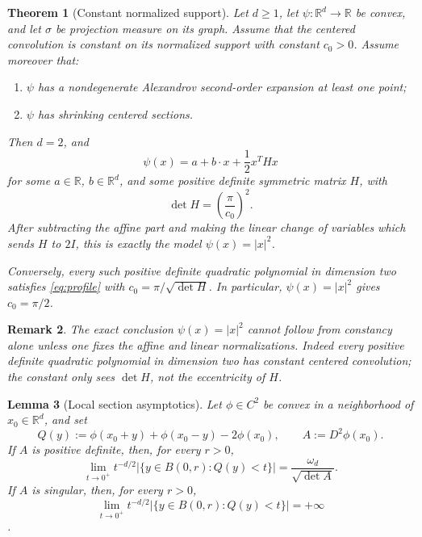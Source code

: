 \documentclass[11pt]{amsart}
\def\R{\mathbb{R}}
\newtheorem{theorem}{Theorem}
\newtheorem{remark}[theorem]{Remark}
\newtheorem{lemma}[theorem]{Lemma}
\begin{document}
\begin{theorem}[Constant normalized support]\label{thm:main}
Let $d\geq 1$, let $\psi:\R^d\to\R$ be convex, and let $\sigma$ be projection
measure on its graph.  Assume that the centered convolution is constant on its
normalized support with constant $c_0>0$.  Assume moreover that:
\begin{enumerate}
    \item $\psi$ has a nondegenerate Alexandrov second-order expansion at
    least one point;
    \item $\psi$ has shrinking centered sections.
\end{enumerate}
Then $d=2$, and
\[
    \psi(x)=a+b\cdot x+\frac12 x^T Hx
\]
for some $a\in\R$, $b\in\R^d$, and some positive definite symmetric matrix
$H$, with
\begin{equation}\label{eq:det-constant}
    \det H=\left(\frac{\pi}{c_0}\right)^2.
\end{equation}
After subtracting the affine part and making the linear change of variables
which sends $H$ to $2I$, this is exactly the model $\psi(x)=|x|^2$.

Conversely, every such positive definite quadratic polynomial in dimension two
satisfies \eqref{eq:profile} with $c_0=\pi/\sqrt{\det H}$.  In particular,
$\psi(x)=|x|^2$ gives $c_0=\pi/2$.
\end{theorem}

\begin{remark}
The exact conclusion $\psi(x)=|x|^2$ cannot follow from constancy alone unless
one fixes the affine and linear normalizations.  Indeed every positive
definite quadratic polynomial in dimension two has constant centered
convolution; the constant only sees $\det H$, not the eccentricity of $H$.
\end{remark}

\begin{lemma}[Local section asymptotics]\label{lem:local-section}
Let $\phi\in C^2$ be convex in a neighborhood of $x_0\in\R^d$, and set
\[
    Q(y):=\phi(x_0+y)+\phi(x_0-y)-2\phi(x_0),\qquad
    A:=D^2\phi(x_0).
\]
If $A$ is positive definite, then, for every $r>0$,
\begin{equation}\label{eq:local-asymp-pd}
    \lim_{t\to0^+}
    t^{-d/2}|\{y\in B(0,r):Q(y)<t\}|
    =\frac{\omega_d}{\sqrt{\det A}}.
\end{equation}
If $A$ is singular, then, for every $r>0$,
\begin{equation}\label{eq:local-asymp-sing}
    \lim_{t\to0^+}
    t^{-d/2}|\{y\in B(0,r):Q(y)<t\}|=+\infty
\end{equation}.
\end{lemma}
\end{document}
